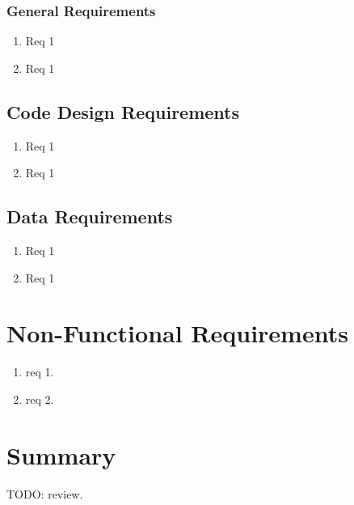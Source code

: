 
\subsubsection{General Requirements}

\begin{enumerate}[label=F\arabic*]

    \item Req 1
    
    \item Req 1
        
\end{enumerate}


\subsection{Code Design Requirements}

\begin{enumerate}[label=F\arabic*]

    \item Req 1
    
    \item Req 1
        
\end{enumerate}

\subsection{Data Requirements}

\begin{enumerate}[label=F\arabic*]

    \item Req 1
    
    \item Req 1
        
\end{enumerate}


\section{Non-Functional Requirements}

\begin{enumerate}[label=NF\arabic*]

    \item req 1.
    
    \item req 2.

\end{enumerate}


\section{Summary}

TODO: review.
